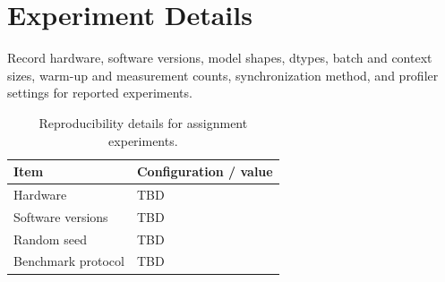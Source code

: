 \section{Experiment Details}
\label{app:experiment-details}

Record hardware, software versions, model shapes, dtypes, batch and context sizes, warm-up and measurement counts, synchronization method, and profiler settings for reported experiments.

\begin{table}[htbp]
\centering\small
\begin{tabular}{@{}ll@{}}
\toprule
Item & Configuration / value \\
\midrule
Hardware & TBD \\
Software versions & TBD \\
Random seed & TBD \\
Benchmark protocol & TBD \\
\bottomrule
\end{tabular}
\caption{Reproducibility details for assignment experiments.}
\label{tab:experiment-details}
\end{table}
